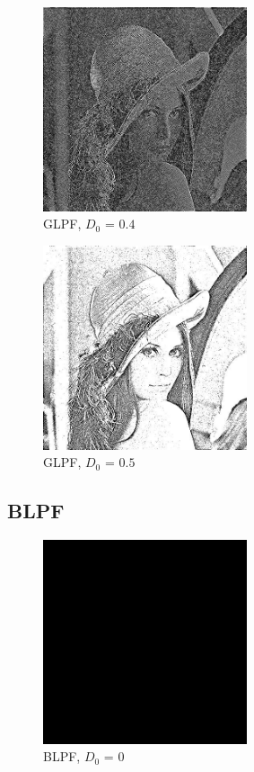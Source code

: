 \documentclass[conference]{IEEEtran}
\begin{document}
\begin{figure}[H]
\centerline{\includegraphics[width=6cm]{GLPF0_4.jpg}}
\caption{GLPF, $D_0$ = $0.4$}
\label{GLPF0.4}
\end{figure}

\begin{figure}[H]
\centerline{\includegraphics[width=6cm]{GLPF0_5.jpg}}
\caption{GLPF, $D_0$ = $0.5$}
\label{GLPF0.5}
\end{figure}


\subsection{BLPF}

\begin{figure}[H]
\centerline{\includegraphics[width=6cm]{BLPF0.jpg}}
\caption{BLPF, $D_0$ = $0$}
\label{BLPF0}
\end{figure}
\end{document}
